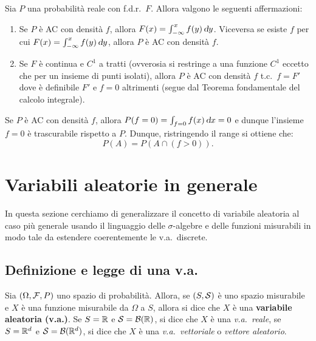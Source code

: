 \begin{multicols*}{2}
\begin{proposition}
    Sia $P$ una probabilità reale con f.d.r.~$F$. Allora valgono le seguenti affermazioni:
    \begin{enumerate}[(i.)]
        \item Se $P$ è AC con densità $f$, allora $F(x) = \int_{-\infty}^x f(y) \dy$. Viceversa
        se esiste $f$ per cui $F(x) = \int_{-\infty}^x f(y) \dy$, allora $P$ è AC con densità
        $f$.
        \item Se $F$ è continua e $C^1$ a tratti (ovverosia si restringe a una funzione $C^1$ eccetto che per un insieme di punti isolati),
        allora $P$ è AC con densità $f$ t.c.~$f = F'$ dove è definibile $F'$ e $f = 0$ altrimenti (segue dal Teorema fondamentale del calcolo integrale).
    \end{enumerate}
\end{proposition}

\begin{remark}
    Se $P$ è AC con densità $f$, allora $P(f = 0) = \int_{f = 0} f(x) \dx = 0$ e dunque
    l'insieme $f = 0$ è trascurabile rispetto a $P$. Dunque, ristringendo il range si
    ottiene che:
    \[
        P(A) = P(A \cap (f > 0)).
    \]
\end{remark}

\section{Variabili aleatorie in generale}

In questa sezione cerchiamo di generalizzare il concetto di variabile aleatoria
al caso più generale usando il linguaggio delle $\sigma$-algebre e delle
funzioni misurabili in modo tale da estendere coerentemente le v.a.~discrete.

\subsection{Definizione e legge di una v.a.}

\begin{definition}
    Sia $(\Omega, \mathcal{F}, P)$ uno spazio di probabilità. Allora, se
    $(S, \mathcal{S})$ è uno spazio misurabile e $X$ è una funzione misurabile
    da $\Omega$ a $S$, allora si dice che $X$ è una \textbf{variabile aleatoria (v.a.)}.
    Se $S = \mathbb{R}$ e $\mathcal{S} = \mathcal{B}(\mathbb{R})$, si dice che $X$ è una \textit{v.a.~reale},
    se $S = \mathbb{R}^d$ e $\mathcal{S} = \mathcal{B}(\mathbb{R}^d)$, si dice che $X$ è una \textit{v.a.~vettoriale}
    o \textit{vettore aleatorio}.
\end{definition}


\end{multicols*}
